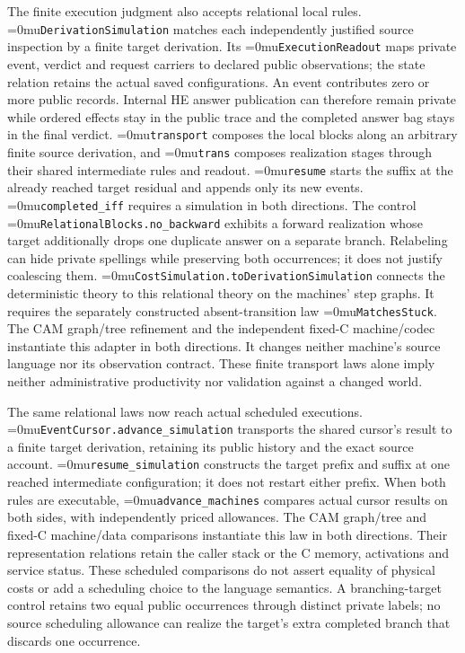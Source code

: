 \documentclass[11pt,a4paper]{article}
\newcommand{\name}[1]{\textup{\Urlmuskip=0mu\relax\nolinkurl{#1}}}
\begin{document}
The finite execution judgment also accepts relational local rules.
\name{DerivationSimulation} matches each independently justified source
inspection by a finite target derivation. Its \name{ExecutionReadout} maps
private event, verdict and request carriers to declared public observations;
the state relation retains the actual saved configurations.
An event contributes zero or more public records. Internal HE answer
publication can therefore remain private while ordered effects stay in the
public trace and the completed answer bag stays in the final verdict.
\name{transport} composes the local blocks along an arbitrary finite source
derivation, and \name{trans} composes realization stages through their shared
intermediate rules and readout. \name{resume} starts the suffix at the
already reached target residual and appends only its new events.
\name{completed_iff} requires a simulation in both directions. The control
\name{RelationalBlocks.no_backward} exhibits a forward realization whose
target additionally drops one duplicate answer on a separate branch.
Relabeling can hide private spellings while preserving both occurrences;
it does not justify coalescing them.
\name{CostSimulation.toDerivationSimulation} connects the deterministic
theory to this relational theory on the machines' step graphs. It requires
the separately constructed absent-transition law \name{MatchesStuck}.
The CAM graph/tree refinement and the independent fixed-C machine/codec
instantiate this adapter in both directions. It changes neither machine's
source language nor its observation contract. These finite transport laws alone imply
neither administrative productivity nor validation against a changed world.

The same relational laws now reach actual scheduled executions.
\name{EventCursor.advance_simulation} transports the shared cursor's result
to a finite target derivation, retaining its public history and the exact
source account. \name{resume_simulation} constructs the target prefix and
suffix at one reached intermediate configuration; it does not restart either
prefix. When both rules are executable, \name{advance_machines} compares
actual cursor results on both sides, with independently priced allowances.
The CAM graph/tree and fixed-C machine/data comparisons instantiate this law
in both directions. Their representation relations retain the caller stack
or the C memory, activations and service status. These scheduled comparisons
do not assert equality of physical costs or add a scheduling choice to the
language semantics. A branching-target control retains two equal public
occurrences through distinct private labels; no source scheduling allowance
can realize the target's extra completed branch that discards one occurrence.
\end{document}
